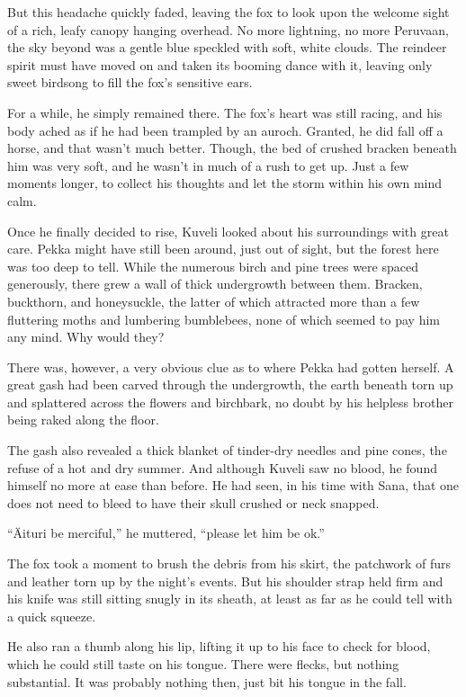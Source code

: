 But this headache quickly faded, leaving the fox to look upon the welcome sight of a rich, leafy canopy hanging overhead. No more lightning, no more Peruvaan, the sky beyond was a gentle blue speckled with soft, white clouds. The reindeer spirit must have moved on and taken its booming dance with it, leaving only sweet birdsong to fill the fox's sensitive ears.

For a while, he simply remained there. The fox's heart was still racing, and his body ached as if he had been trampled by an auroch. Granted, he did fall off a horse, and that wasn't much better. Though, the bed of crushed bracken beneath him was very soft, and he wasn't in much of a rush to get up. Just a few moments longer, to collect his thoughts and let the storm within his own mind calm.

Once he finally decided to rise, Kuveli looked about his surroundings with great care. Pekka might have still been around, just out of sight, but the forest here was too deep to tell. While the numerous birch and pine trees were spaced generously, there grew a wall of thick undergrowth between them. Bracken, buckthorn, and honeysuckle, the latter of which attracted more than a few fluttering moths and lumbering bumblebees, none of which seemed to pay him any mind. Why would they?

There was, however, a very obvious clue as to where Pekka had gotten herself. A great gash had been carved through the undergrowth, the earth beneath torn up and splattered across the flowers and birchbark, no doubt by his helpless brother being raked along the floor.

The gash also revealed a thick blanket of tinder-dry needles and pine cones, the refuse of a hot and dry summer. And although Kuveli saw no blood, he found himself no more at ease than before. He had seen, in his time with Sana, that one does not need to bleed to have their skull crushed or neck snapped.

``Äituri be merciful,'' he muttered, ``please let him be ok.''

The fox took a moment to brush the debris from his skirt, the patchwork of furs and leather torn up by the night's events. But his shoulder strap held firm and his knife was still sitting snugly in its sheath, at least as far as he could tell with a quick squeeze.

He also ran a thumb along his lip, lifting it up to his face to check for blood, which he could still taste on his tongue. There were flecks, but nothing substantial. It was probably nothing then, just bit his tongue in the fall.

